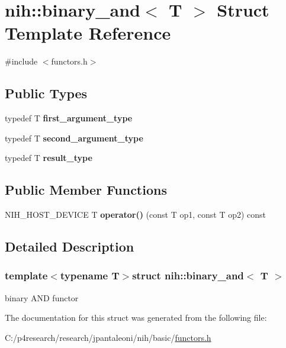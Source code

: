 \hypertarget{structnih_1_1binary__and}{
\section{nih\-:\-:binary\-\_\-and$<$ \-T $>$ \-Struct \-Template \-Reference}
\label{structnih_1_1binary__and}
}


{\ttfamily \#include $<$functors.\-h$>$}

\subsection*{\-Public \-Types}
\begin{DoxyCompactItemize}
\item 
\hypertarget{structnih_1_1binary__and_adf198304468e597f05bb53ddce5dd0ef}{
typedef \-T {\bfseries first\-\_\-argument\-\_\-type}}
\label{structnih_1_1binary__and_adf198304468e597f05bb53ddce5dd0ef}

\item 
\hypertarget{structnih_1_1binary__and_ae2f9800f7c37b358ffd14994bb258f85}{
typedef \-T {\bfseries second\-\_\-argument\-\_\-type}}
\label{structnih_1_1binary__and_ae2f9800f7c37b358ffd14994bb258f85}

\item 
\hypertarget{structnih_1_1binary__and_a56f25c31fcb0c18e65ff47d287c6d526}{
typedef \-T {\bfseries result\-\_\-type}}
\label{structnih_1_1binary__and_a56f25c31fcb0c18e65ff47d287c6d526}

\end{DoxyCompactItemize}
\subsection*{\-Public \-Member \-Functions}
\begin{DoxyCompactItemize}
\item 
\hypertarget{structnih_1_1binary__and_a32d4d58a96e8a11e607dd77fa213b7f4}{
\-N\-I\-H\-\_\-\-H\-O\-S\-T\-\_\-\-D\-E\-V\-I\-C\-E \-T {\bfseries operator()} (const \-T op1, const \-T op2) const }
\label{structnih_1_1binary__and_a32d4d58a96e8a11e607dd77fa213b7f4}

\end{DoxyCompactItemize}


\subsection{\-Detailed \-Description}
\subsubsection*{template$<$typename T$>$struct nih\-::binary\-\_\-and$<$ T $>$}

binary \-A\-N\-D functor 

\-The documentation for this struct was generated from the following file\-:\begin{DoxyCompactItemize}
\item 
\-C\-:/p4research/research/jpantaleoni/nih/basic/\hyperlink{functors_8h}{functors.\-h}\end{DoxyCompactItemize}

